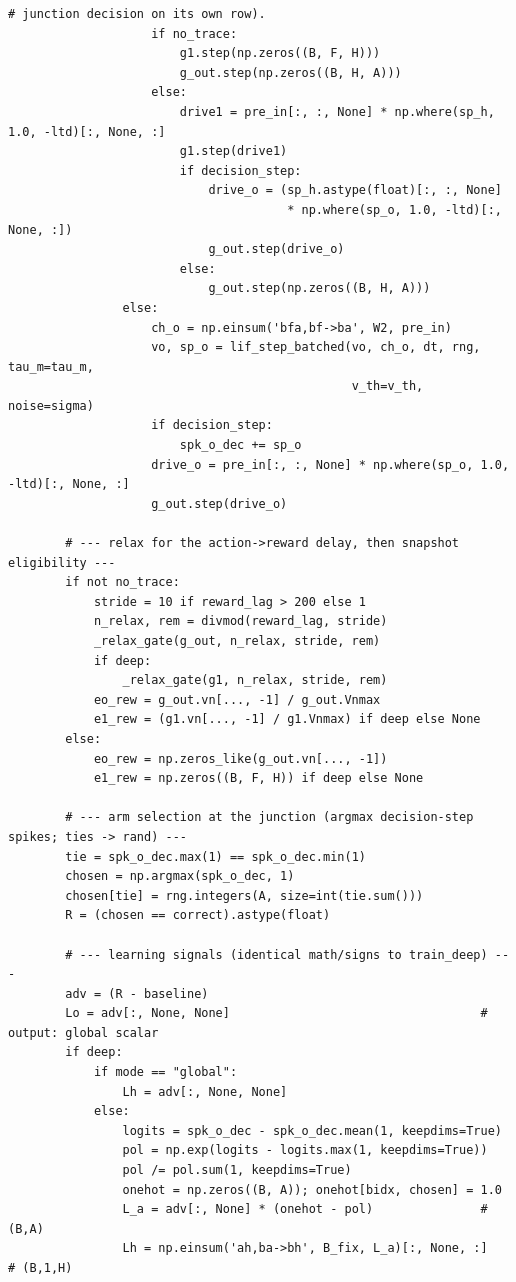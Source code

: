 \begin{lstlisting}[caption={mrl\_trace/deep\_sequential.py},label={lst:siox-src-deep_sequential}]
                    # junction decision on its own row).
                    if no_trace:
                        g1.step(np.zeros((B, F, H)))
                        g_out.step(np.zeros((B, H, A)))
                    else:
                        drive1 = pre_in[:, :, None] * np.where(sp_h, 1.0, -ltd)[:, None, :]
                        g1.step(drive1)
                        if decision_step:
                            drive_o = (sp_h.astype(float)[:, :, None]
                                       * np.where(sp_o, 1.0, -ltd)[:, None, :])
                            g_out.step(drive_o)
                        else:
                            g_out.step(np.zeros((B, H, A)))
                else:
                    ch_o = np.einsum('bfa,bf->ba', W2, pre_in)
                    vo, sp_o = lif_step_batched(vo, ch_o, dt, rng, tau_m=tau_m,
                                                v_th=v_th, noise=sigma)
                    if decision_step:
                        spk_o_dec += sp_o
                    drive_o = pre_in[:, :, None] * np.where(sp_o, 1.0, -ltd)[:, None, :]
                    g_out.step(drive_o)

        # --- relax for the action->reward delay, then snapshot eligibility ---
        if not no_trace:
            stride = 10 if reward_lag > 200 else 1
            n_relax, rem = divmod(reward_lag, stride)
            _relax_gate(g_out, n_relax, stride, rem)
            if deep:
                _relax_gate(g1, n_relax, stride, rem)
            eo_rew = g_out.vn[..., -1] / g_out.Vnmax
            e1_rew = (g1.vn[..., -1] / g1.Vnmax) if deep else None
        else:
            eo_rew = np.zeros_like(g_out.vn[..., -1])
            e1_rew = np.zeros((B, F, H)) if deep else None

        # --- arm selection at the junction (argmax decision-step spikes; ties -> rand) ---
        tie = spk_o_dec.max(1) == spk_o_dec.min(1)
        chosen = np.argmax(spk_o_dec, 1)
        chosen[tie] = rng.integers(A, size=int(tie.sum()))
        R = (chosen == correct).astype(float)

        # --- learning signals (identical math/signs to train_deep) ---
        adv = (R - baseline)
        Lo = adv[:, None, None]                                   # output: global scalar
        if deep:
            if mode == "global":
                Lh = adv[:, None, None]
            else:
                logits = spk_o_dec - spk_o_dec.mean(1, keepdims=True)
                pol = np.exp(logits - logits.max(1, keepdims=True))
                pol /= pol.sum(1, keepdims=True)
                onehot = np.zeros((B, A)); onehot[bidx, chosen] = 1.0
                L_a = adv[:, None] * (onehot - pol)               # (B,A)
                Lh = np.einsum('ah,ba->bh', B_fix, L_a)[:, None, :]   # (B,1,H)


\end{lstlisting}
